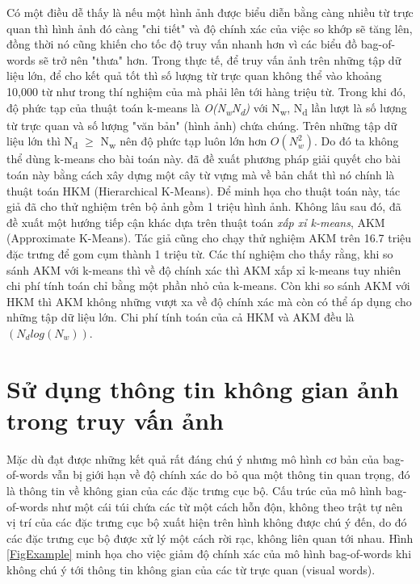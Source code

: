 Có một điều dễ thấy là nếu một hình ảnh được biểu diễn bằng càng nhiều từ trực quan thì hình ảnh đó càng "chi tiết" và độ chính xác của việc so khớp sẽ tăng lên, đồng thời nó cũng khiến cho tốc độ truy vấn nhanh hơn vì các biểu đồ bag-of-words sẽ trở nên "thưa" hơn. Trong thực tế, để truy vấn ảnh trên những tập dữ liệu lớn, để cho kết quả tốt thì số lượng từ trực quan không thể vào khoảng 10,000 từ như trong thí nghiệm của \cite{sivic2003video} mà phải lên tới hàng triệu từ. Trong khi đó, độ phức tạp của thuật toán k-means là \textit{O(N\textsubscript{w}N\textsubscript{d})} với N\textsubscript{w}, N\textsubscript{d} lần lượt là số lượng từ trực quan và số lượng "văn bản" (hình ảnh) chứa chúng. Trên những tập dữ liệu lớn thì N\textsubscript{d} $\geq$ N\textsubscript{w} nên độ phức tạp luôn lớn hơn $O(N^2_w)$. Do đó ta không thể dùng k-means cho bài toán này. \cite{nister2006scalable} đã đề xuất phương pháp giải quyết cho bài toán này bằng cách xây dựng một cây từ vựng mà về bản chất thì nó chính là thuật toán HKM (Hierarchical K-Means). Để minh họa cho thuật toán này, tác giả đã cho thử nghiệm trên bộ ảnh gồm 1 triệu hình ảnh. Không lâu sau đó, \cite{philbin2007object} đã đề xuất một hướng tiếp cận khác dựa trên thuật toán \textit{xấp xỉ k-means}, AKM (Approximate K-Means). Tác giả cũng cho chạy thử nghiệm AKM trên 16.7 triệu đặc trưng để gom cụm thành 1 triệu từ. Các thí nghiệm cho thấy rằng, khi so sánh AKM với k-means thì về độ chính xác thì AKM xấp xỉ k-means tuy nhiên chi phí tính toán chỉ bằng một phần nhỏ của k-means. Còn khi so sánh AKM với HKM thì AKM không những vượt xa về độ chính xác mà còn có thể áp dụng cho những tập dữ liệu lớn. Chi phí tính toán của cả HKM và AKM đều là $(N_d log(N_w))$.

\section{Sử dụng thông tin không gian ảnh trong truy vấn ảnh}
\label{spatial}
Mặc dù đạt được những kết quả rất đáng chú ý nhưng mô hình cơ bản của bag-of-words vẫn bị giới hạn về độ chính xác do bỏ qua một thông tin quan trọng, đó là thông tin về không gian của các đặc trưng cục bộ. Cấu trúc của mô hình bag-of-words như một cái túi chứa các từ một cách hỗn độn, không theo trật tự nên vị trí của các đặc trưng cục bộ xuất hiện trên hình không được chú ý đến, do đó các đặc trưng cục bộ được xử lý một cách rời rạc, không liên quan tới nhau. Hình \ref{FigExample} minh họa cho việc giảm độ chính xác của mô hình bag-of-words khi không chú ý tới thông tin không gian của các từ trực quan (visual words).\\ 

